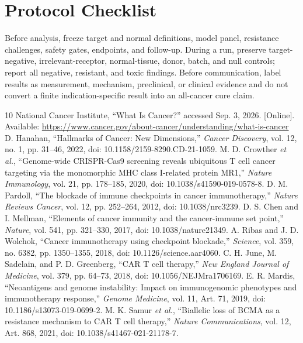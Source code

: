 \documentclass[10pt,conference]{IEEEtran}
\begin{document}
\section{Protocol Checklist}
Before analysis, freeze target and normal definitions, model panel, resistance challenges, safety gates, endpoints, and follow-up. During a run, preserve target-negative, irrelevant-receptor, normal-tissue, donor, batch, and null controls; report all negative, resistant, and toxic findings. Before communication, label results as measurement, mechanism, preclinical, or clinical evidence and do not convert a finite indication-specific result into an all-cancer cure claim.
\newpage
\begin{thebibliography}{10}
National Cancer Institute, ``What Is Cancer?'' accessed Sep. 3, 2026. [Online]. Available: \url{https://www.cancer.gov/about-cancer/understanding/what-is-cancer}
D. Hanahan, ``Hallmarks of Cancer: New Dimensions,'' \emph{Cancer Discovery}, vol. 12, no. 1, pp. 31--46, 2022, doi: 10.1158/2159-8290.CD-21-1059.
M. D. Crowther \emph{et al.}, ``Genome-wide CRISPR-Cas9 screening reveals ubiquitous T cell cancer targeting via the monomorphic MHC class I-related protein MR1,'' \emph{Nature Immunology}, vol. 21, pp. 178--185, 2020, doi: 10.1038/s41590-019-0578-8.
D. M. Pardoll, ``The blockade of immune checkpoints in cancer immunotherapy,'' \emph{Nature Reviews Cancer}, vol. 12, pp. 252--264, 2012, doi: 10.1038/nrc3239.
D. S. Chen and I. Mellman, ``Elements of cancer immunity and the cancer-immune set point,'' \emph{Nature}, vol. 541, pp. 321--330, 2017, doi: 10.1038/nature21349.
A. Ribas and J. D. Wolchok, ``Cancer immunotherapy using checkpoint blockade,'' \emph{Science}, vol. 359, no. 6382, pp. 1350--1355, 2018, doi: 10.1126/science.aar4060.
C. H. June, M. Sadelain, and P. D. Greenberg, ``CAR T cell therapy,'' \emph{New England Journal of Medicine}, vol. 379, pp. 64--73, 2018, doi: 10.1056/NEJMra1706169.
E. R. Mardis, ``Neoantigens and genome instability: Impact on immunogenomic phenotypes and immunotherapy response,'' \emph{Genome Medicine}, vol. 11, Art. 71, 2019, doi: 10.1186/s13073-019-0699-2.
M. K. Samur \emph{et al.}, ``Biallelic loss of BCMA as a resistance mechanism to CAR T cell therapy,'' \emph{Nature Communications}, vol. 12, Art. 868, 2021, doi: 10.1038/s41467-021-21178-7.
\end{thebibliography}
\end{document}
